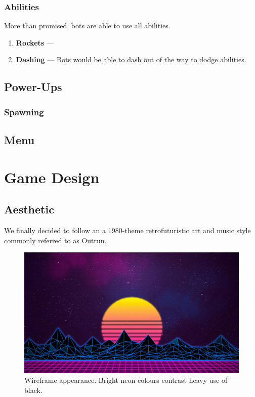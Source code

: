 \documentclass{article}
\theoremstyle{definition}
\begin{document}

\subsubsection{Abilities}

More than promised, bots are able to use all abilities.

\begin{enumerate}
  \item \textbf{Rockets} ---
  \item \textbf{Dashing} --- Bots would be able to dash out of the way to dodge
    abilities.
\end{enumerate}

\subsection{Power-Ups}


\subsubsection{Spawning}


\subsection{Menu}

\section{Game Design}

\subsection{Aesthetic}

We finally decided to follow an a 1980-theme retrofuturistic art and music style
commonly referred to as Outrun.

\begin{figure}[htpb]
  \centering
  \includegraphics[width=0.8\linewidth]{images/art/main_menu4.jpg}
  \caption{Wireframe appearance. Bright neon colours contrast heavy use of black.}
\label{fig:theme01}
\end{figure}
\end{document}
